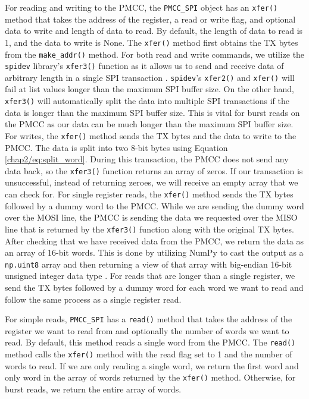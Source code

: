 For reading and writing to the PMCC, the \texttt{PMCC\_SPI} object has an \texttt{xfer()} method that takes the address of the register, a read or write flag, and optional data to write and length of data to read.
By default, the length of data to read is 1, and the data to write is None.
The \texttt{xfer()} method first obtains the TX bytes from the \texttt{make\_addr()} method.
For both read and write commands, we utilize the \texttt{spidev} library's \texttt{xfer3()} function as it allows us to send and receive data of arbitrary length in a single SPI transaction \citep{spidev}.
\texttt{spidev}'s \texttt{xfer2()} and \texttt{xfer()} will fail at list values longer than the maximum SPI buffer size.
On the other hand, \texttt{xfer3()} will automatically split the data into multiple SPI transactions if the data is longer than the maximum SPI buffer size.
This is vital for burst reads on the PMCC as our data can be much longer than the maximum SPI buffer size.
For writes, the \texttt{xfer()} method sends the TX bytes and the data to write to the PMCC.
The data is split into two 8-bit bytes using Equation \ref{chap2/eq:split_word}.
During this transaction, the PMCC does not send any data back, so the \texttt{xfer3()} function returns an array of zeros.
If our transaction is unsuccessful, instead of returning zeroes, we will receive an empty array that we can check for.
For single register reads, the \texttt{xfer()} method sends the TX bytes followed by a dummy word to the PMCC.
While we are sending the dummy word over the MOSI line, the PMCC is sending the data we requested over the MISO line that is returned by the \texttt{xfer3()} function along with the original TX bytes.
After checking that we have received data from the PMCC, we return the data as an array of 16-bit words.
This is done by utilizing NumPy to cast the output as a \texttt{np.uint8} array and then returning a view of that array with big-endian 16-bit unsigned integer data type \citep{numpy}.
For reads that are longer than a single register, we send the TX bytes followed by a dummy word for each word we want to read and follow the same process as a single register read.

For simple reads, \texttt{PMCC\_SPI} has a \texttt{read()} method that takes the address of the register we want to read from and optionally the number of words we want to read.
By default, this method reads a single word from the PMCC.
The \texttt{read()} method calls the \texttt{xfer()} method with the read flag set to 1 and the number of words to read.
If we are only reading a single word, we return the first word and only word in the array of words returned by the \texttt{xfer()} method. 
Otherwise, for burst reads, we return the entire array of words.

